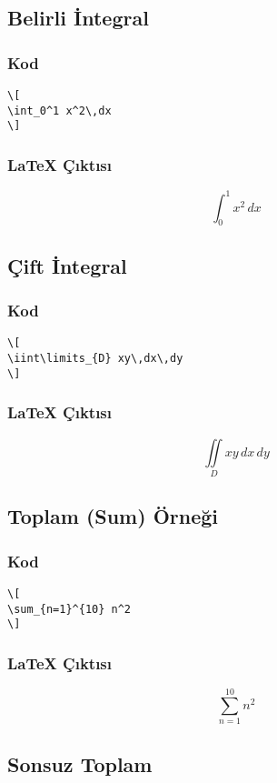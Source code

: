 \documentclass[a4paper,12pt]{article}
\begin{document}
\subsection{Belirli İntegral}
\subsubsection{Kod}
\begin{verbatim}
\[
\int_0^1 x^2\,dx
\]
\end{verbatim}

\subsubsection{\LaTeX{} Çıktısı}
\[
\int_0^1 x^2\,dx
\]

\subsection{Çift İntegral}
\subsubsection{Kod}
\begin{verbatim}
\[
\iint\limits_{D} xy\,dx\,dy
\]
\end{verbatim}

\subsubsection{\LaTeX{} Çıktısı}
\[
\iint\limits_{D} xy\,dx\,dy
\]

\subsection{Toplam (Sum) Örneği}
\subsubsection{Kod}
\begin{verbatim}
\[
\sum_{n=1}^{10} n^2
\]
\end{verbatim}

\subsubsection{\LaTeX{} Çıktısı}
\[
\sum_{n=1}^{10} n^2
\]

\subsection{Sonsuz Toplam}
\end{document}
